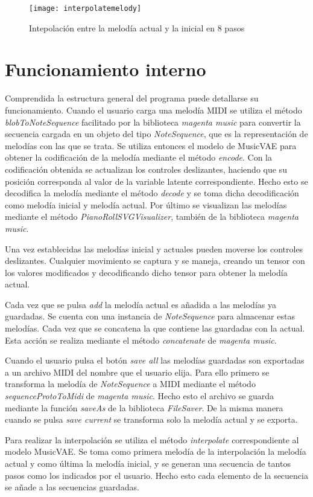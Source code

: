 \begin{figure}[htpb]
  \centering
  \texttt{[image: interpolatemelody]}
  \caption{Intepolación entre la melodía actual y la inicial en 8 pasos}
  \label{fig:savemelody}
\end{figure}

\section{Funcionamiento interno}

Comprendida la estructura general del programa puede detallarse su funcionamiento. Cuando el usuario carga una melodía MIDI se utiliza el método \textit{blobToNoteSequence} facilitado por la biblioteca \textit{magenta music} para convertir la secuencia cargada en un objeto del tipo \textit{NoteSequence}, que es la representación de melodías con las que se trata. Se utiliza entonces el modelo de MusicVAE para obtener la codificación de la melodía mediante el método \textit{encode}. Con la codificación obtenida se actualizan los controles deslizantes, haciendo que su posición corresponda al valor de la variable latente correspondiente. Hecho esto se decodifica la melodía mediante el método \textit{decode} y se toma dicha decodificación como melodía inicial y melodía actual. Por último se visualizan las melodías mediante el método \textit{PianoRollSVGVisualizer}, también de la biblioteca \textit{magenta music}.

Una vez establecidas las melodías inicial y actuales pueden moverse los controles deslizantes. Cualquier movimiento se captura y se maneja, creando un tensor con los valores modificados y decodificando dicho tensor para obtener la melodía actual.

Cada vez que se pulsa \textit{add} la melodía actual es añadida a las melodías ya guardadas. Se cuenta con una instancia de \textit{NoteSequence} para almacenar estas melodías. Cada vez que se concatena la que contiene las guardadas con la actual. Esta acción se realiza mediante el método \textit{concatenate} de \textit{magenta music}.

Cuando el usuario pulsa el botón \textit{save all} las melodías guardadas son exportadas a un archivo MIDI del nombre que el usuario elija. Para ello primero se transforma la melodía de \textit{NoteSequence} a MIDI mediante el método \textit{sequenceProtoToMidi} de \textit{magenta music}. Hecho esto el archivo se guarda mediante la función \textit{saveAs} de la biblioteca \textit{FileSaver}. De la misma manera cuando se pulsa \textit{save current} se transforma solo la melodía actual y se exporta.

Para realizar la interpolación se utiliza el método \textit{interpolate} correspondiente al modelo MusicVAE. Se toma como primera melodía de la interpolación la melodía actual y como última la melodía inicial, y se generan una secuencia de tantos pasos como los indicados por el usuario. Hecho esto cada elemento de la secuencia se añade a las secuencias guardadas.

\endinput
